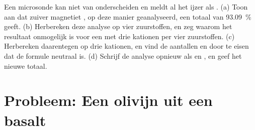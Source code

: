 \begin{exercise}[$\star\star\star$]\label{exo:b1:rock-forming-minerals:12}
Een microsonde kan  niet van  onderscheiden en meldt al het ijzer als . (a) Toon aan dat zuiver magnetiet
, op deze manier geanalyseerd, een totaal van \qty{93.09}{\percent} geeft. (b) Herbereken deze analyse op vier zuurstoffen, en
zeg waarom het resultaat onmogelijk is voor een  met drie kationen per vier zuurstoffen. (c) Herbereken daarentegen op drie kationen,
en vind de aantallen  en  door te eisen dat de formule neutraal is. (d) Schrijf de analyse opnieuw als  en
, en geef het nieuwe totaal.
\end{exercise}

\section{Probleem: Een olivijn uit een basalt}

